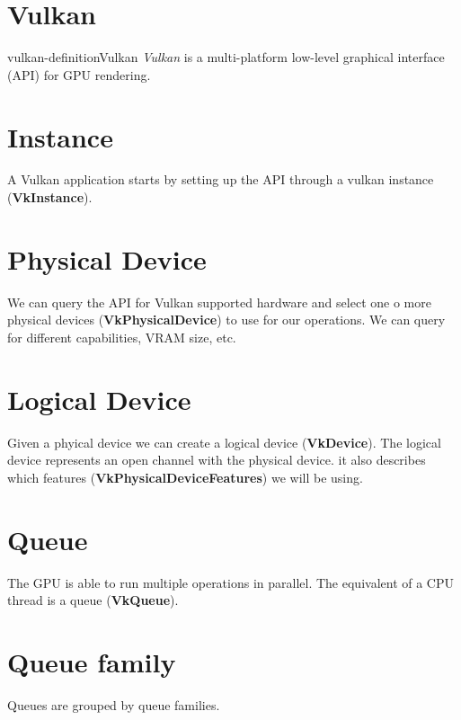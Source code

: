 \documentclass[preview]{standalone}
\begin{document}
\genpage

\section{Vulkan}

\begin{snippetdefinition}{vulkan-definition}{Vulkan}
	\textit{Vulkan} is a multi-platform low-level graphical interface (API)
	for GPU rendering.
\end{snippetdefinition}


\section{Instance}

A Vulkan application starts by setting up the API through a vulkan instance
(\textbf{VkInstance}).

\section{Physical Device}

We can query the API for Vulkan supported hardware and select
one o more physical devices (\textbf{VkPhysicalDevice}) to use for our operations.
We can query for different capabilities, VRAM size, etc.

\section{Logical Device}

Given a phyical device we can create a logical device (\textbf{VkDevice}).
The logical device represents an open channel with the physical device.
it also describes which features (\textbf{VkPhysicalDeviceFeatures}) we will be using.

\section{Queue}

The GPU is able to run multiple operations in parallel.
The equivalent of a CPU thread is a queue (\textbf{VkQueue}).

\section{Queue family}

Queues are grouped by queue families.
\end{document}
